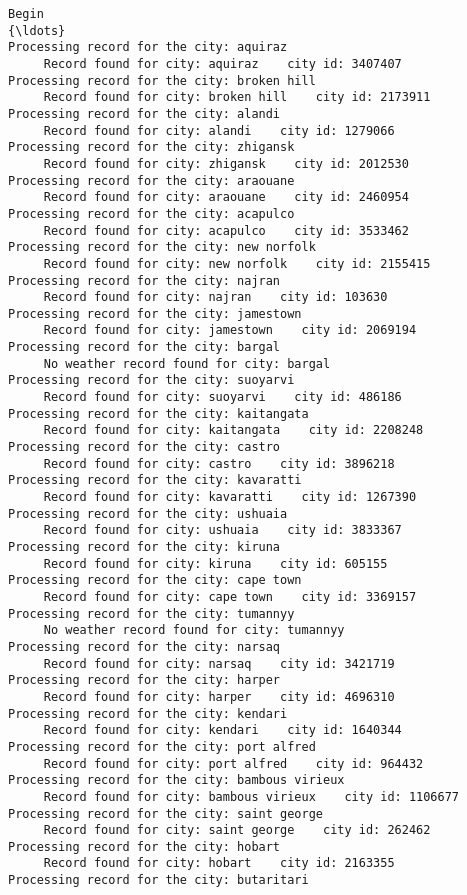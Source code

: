 \documentclass[11pt]{article}
\begin{document}
    \begin{Verbatim}[commandchars=\\\{\}]
Begin
{\ldots}
Processing record for the city: aquiraz
     Record found for city: aquiraz    city id: 3407407
Processing record for the city: broken hill
     Record found for city: broken hill    city id: 2173911
Processing record for the city: alandi
     Record found for city: alandi    city id: 1279066
Processing record for the city: zhigansk
     Record found for city: zhigansk    city id: 2012530
Processing record for the city: araouane
     Record found for city: araouane    city id: 2460954
Processing record for the city: acapulco
     Record found for city: acapulco    city id: 3533462
Processing record for the city: new norfolk
     Record found for city: new norfolk    city id: 2155415
Processing record for the city: najran
     Record found for city: najran    city id: 103630
Processing record for the city: jamestown
     Record found for city: jamestown    city id: 2069194
Processing record for the city: bargal
     No weather record found for city: bargal
Processing record for the city: suoyarvi
     Record found for city: suoyarvi    city id: 486186
Processing record for the city: kaitangata
     Record found for city: kaitangata    city id: 2208248
Processing record for the city: castro
     Record found for city: castro    city id: 3896218
Processing record for the city: kavaratti
     Record found for city: kavaratti    city id: 1267390
Processing record for the city: ushuaia
     Record found for city: ushuaia    city id: 3833367
Processing record for the city: kiruna
     Record found for city: kiruna    city id: 605155
Processing record for the city: cape town
     Record found for city: cape town    city id: 3369157
Processing record for the city: tumannyy
     No weather record found for city: tumannyy
Processing record for the city: narsaq
     Record found for city: narsaq    city id: 3421719
Processing record for the city: harper
     Record found for city: harper    city id: 4696310
Processing record for the city: kendari
     Record found for city: kendari    city id: 1640344
Processing record for the city: port alfred
     Record found for city: port alfred    city id: 964432
Processing record for the city: bambous virieux
     Record found for city: bambous virieux    city id: 1106677
Processing record for the city: saint george
     Record found for city: saint george    city id: 262462
Processing record for the city: hobart
     Record found for city: hobart    city id: 2163355
Processing record for the city: butaritari

\end{Verbatim}
\end{document}
